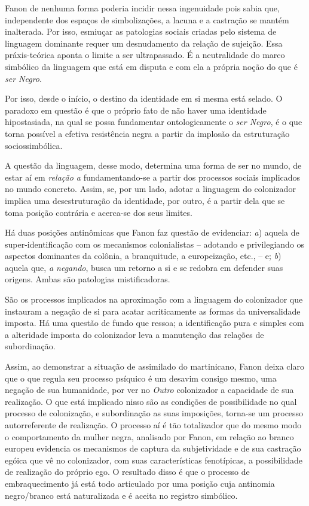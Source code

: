 Fanon de nenhuma forma poderia incidir nessa ingenuidade pois sabia que,
independente dos espaços de simbolizações, a lacuna e a castração se
mantém inalterada. Por isso, esmiuçar as patologias sociais criadas pelo
sistema de linguagem dominante requer um desnudamento da relação de
sujeição. Essa práxis-teórica aponta o limite a ser ultrapassado. É a
neutralidade do marco simbólico da linguagem que está em disputa e com
ela a própria noção do que é \emph{ser Negro}.

Por isso, desde o início, o destino da identidade em si mesma está
selado. O paradoxo em questão é que o próprio fato de não haver uma
identidade hipostasiada, na qual se possa fundamentar ontologicamente o
\emph{ser Negro}, é o que torna possível a efetiva resistência negra a
partir da implosão da estruturação sociossimbólica.

A questão da linguagem, desse modo, determina uma forma de ser no mundo,
de estar aí em \emph{relação a} fundamentando-se a partir dos processos
sociais implicados no mundo concreto. Assim, se, por um lado, adotar a
linguagem do colonizador implica uma desestruturação da identidade, por
outro, é a partir dela que se toma posição contrária e acerca-se dos
seus limites.

Há duas posições antinômicas que Fanon faz questão de evidenciar:
\emph{a}) aquela de super-identificação com os mecanismos colonialistas
-- adotando e privilegiando os aspectos dominantes da colônia, a
branquitude, a europeização, etc., -- e; \emph{b}) aquela que, \emph{a
negando}, busca um retorno a si e se redobra em defender suas origens.
Ambas são patologias mistificadoras.

São os processos implicados na aproximação com a linguagem do
colonizador que instauram a negação de si para acatar acriticamente as
formas da universalidade imposta. Há uma questão de fundo que ressoa; a
identificação pura e simples com a alteridade imposta do colonizador
leva a manutenção das relações de subordinação.

Assim, ao demonstrar a situação de assimilado do martinicano, Fanon
deixa claro que o que regula seu processo psíquico é um desavim consigo
mesmo, uma negação de sua humanidade, por ver no \emph{Outro}
colonizador a capacidade de sua realização. O que está implicado nisso
são as condições de possibilidade no qual processo de colonização, e
subordinação as suas imposições, torna-se um processo autorreferente de
realização. O processo aí é tão totalizador que do mesmo modo o
comportamento da mulher negra, analisado por Fanon, em relação ao branco
europeu evidencia os mecanismos de captura da subjetividade e de sua
castração egóica que vê no colonizador, com suas características
fenotípicas, a possibilidade de realização do próprio ego. O resultado
disso é que o processo de embraquecimento já está todo articulado por
uma posição cuja antinomia negro/branco está naturalizada e é aceita no
registro simbólico.

